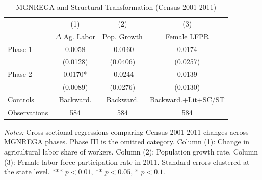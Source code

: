 \begin{table}[htbp]
\centering
\caption{MGNREGA and Structural Transformation (Census 2001-2011)}
\label{tab:mechanism}
\begin{tabular}{lccc}
\hline\hline
 & (1) & (2) & (3) \\
 & $\Delta$ Ag. Labor & Pop. Growth & Female LFPR \\
\hline
Phase 1 & 0.0058 & -0.0160 & 0.0174 \\
 & (0.0128) & (0.0406) & (0.0257) \\
Phase 2 & 0.0170* & -0.0244 & 0.0139 \\
 & (0.0089) & (0.0276) & (0.0130) \\
\hline
Controls & Backward. & Backward. & Backward.+Lit+SC/ST \\
Observations & 584 & 584 & 584 \\
\hline\hline
\end{tabular}
\begin{tablenotes}[flushleft]\small
\item \textit{Notes:} Cross-sectional regressions comparing Census 2001-2011 changes across MGNREGA phases. Phase III is the omitted category. Column (1): Change in agricultural labor share of workers. Column (2): Population growth rate. Column (3): Female labor force participation rate in 2011. Standard errors clustered at the state level. *** $p<0.01$, ** $p<0.05$, * $p<0.1$.
\end{tablenotes}
\end{table}
